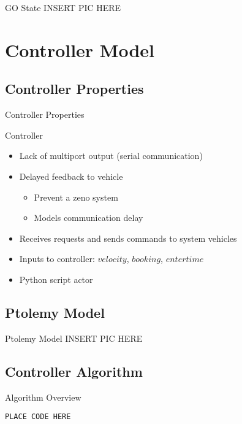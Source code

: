 \documentclass{beamer}
\begin{document}
\begin{frame}{GO State}
INSERT PIC HERE
\end{frame}

\section{Controller Model}

\subsection{Controller Properties}

\begin{frame}{Controller Properties}
\begin{block}{Controller}
\begin{itemize}
\item Lack of multiport output (serial communication)
\item Delayed feedback to vehicle
\begin{itemize}
\item Prevent a zeno system
\item Models communication delay
\end{itemize}
\item Receives requests and sends commands to system vehicles
\item Inputs to controller: $velocity$, $booking$, $entertime$ 
\item Python script actor
\end{itemize}
\end{block}
\end{frame}

\subsection{Ptolemy Model}

\begin{frame}{Ptolemy Model}
INSERT PIC HERE
\end{frame}

\subsection{Controller Algorithm}
\begin{frame}{Algorithm Overview}
\begin{lstlisting}
PLACE CODE HERE
\end{lstlisting}
\end{frame}
\end{document}
